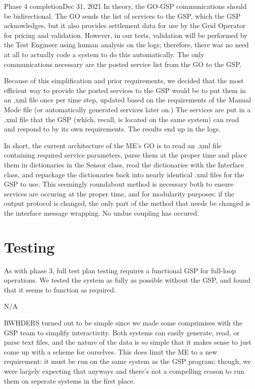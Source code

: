 \begin{entry}{Phase 4 completion}{Dec 31, 2021}
    In theory, the GO-GSP communications should be bidirectional. The GO sends the list of services to the GSP, which the
    GSP acknowledges, but it also provides settlement data for use by the Grid Operator for pricing and validation.
    However, in our tests, validation will be performed by the Test Engineer using human analysis on the logs; therefore,
    there was no need at all to actually code a system to do this automatically. The only communications necessary
    are the posted service list from the GO to the GSP.

    Because of this simplification and prior requirements, we decided that the most efficient way to provide the posted
    services to the GSP would be to put them in an .xml file once per time step, updated based on the requirements of
    the Manual Mode file (or automatically generated services later on.) The services are put in a .xml file that the
    GSP (which, recall, is located on the same system) can read and respond to by its own requirements. The results
    end up in the logs.

    In short, the current architecture of the ME's GO is to read an .xml file containing required service parameters,
    parse them at the proper time and place them in dictionaries in the Sensor class, read the dictionaries with the
    Interface class, and repackage the dictionaries back into nearly identical .xml files for the GSP to use. This
    seemingly roundabout method is necessary both to ensure services are occuring at the proper time, and for
    modularity purposes: if the output protocol is changed, the only part of the method that needs be changed is the
    interface message wrapping. No undue coupling has occured.

    \section*{Testing}
    As with phase 3, full test plan testing requires a functional GSP for full-loop operations. We tested the system
    as fully as possible without the GSP, and found that it seems to function as required.


    \parameters
    
    N/A

    \observations

    RWHDERS turned out to be simple since we made some comprimises with the GSP team to simplify interactivity. Both
    systems can easily generate, read, or parse text files, and the nature of the data is so simple that it makes sense
    to just come up with a scheme for ourselves. This does limit the ME to a new requirement: it must be run on the
    same system as the GSP program; though, we were largely expecting that anyways and there's not a compelling reason
    to run them on seperate systems in the first place.



\end{entry}
